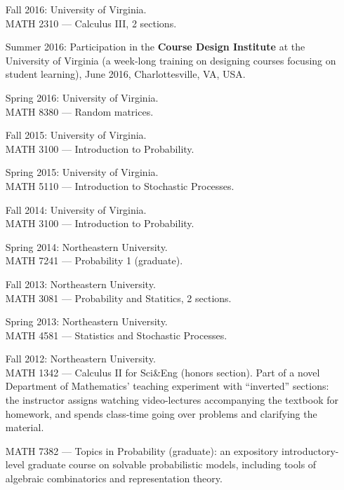 \documentclass[letterpaper,11pt]{article}
\begin{document}
\begin{itemize}
	\item[Fall 2016:]
  University of Virginia. \\
  MATH 2310 --- Calculus III, 2 sections.

  \item[Summer 2016:] Participation in the \textbf{Course Design Institute} at the University of Virginia (a week-long training on designing courses focusing on student learning), June 2016, Charlottesville, VA, USA.

  \item[Spring 2016:]
  University of Virginia. \\
  MATH 8380 --- Random matrices.

  \item[Fall 2015:]   
  University of Virginia. \\
  MATH 3100 --- Introduction to Probability.

	\item[Spring 2015:]   
	University of Virginia. \\
	MATH 5110 --- Introduction to Stochastic Processes.

	\item[Fall 2014:]   
	University of Virginia. \\
	MATH 3100 --- Introduction to Probability.

  \item[Spring 2014:]   
  Northeastern University. \\
  MATH 7241 --- 
  Probability 1 (graduate).

  \item[Fall 2013:]   
  Northeastern University. \\
  MATH 3081 --- 
  Probability and Statitics, 2 sections.
  \item[Spring 2013:] 
  Northeastern University. 
  \\
  MATH 4581 --- Statistics and Stochastic Processes.
  \item[Fall 2012:]
  Northeastern University. 
  \\
  MATH 1342 --- 
  Calculus II for Sci\&Eng (honors section). Part of a novel Department of Mathematics' teaching experiment with ``inverted'' sections: the instructor assigns watching video-lectures accompanying the textbook for homework, and spends class-time going over problems and clarifying the material.

  MATH 7382 --- Topics in Probability (graduate): an expository introductory-level graduate course on solvable probabilistic models, including tools of algebraic combinatorics and representation theory.


\end{itemize}
\end{document}

